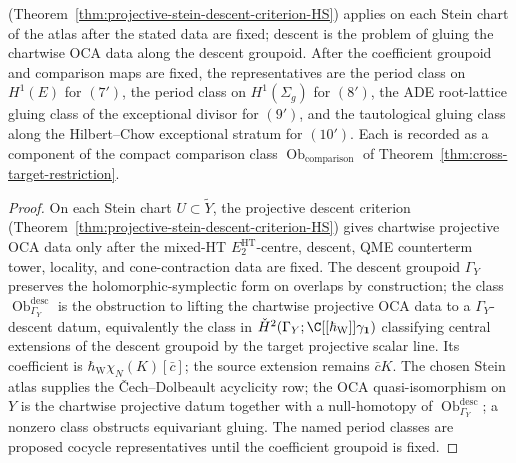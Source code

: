 \begin{cor}
(Theorem~\ref{thm:projective-stein-descent-criterion-HS})
applies on each Stein chart of the atlas after the stated data are
        fixed; descent is the problem of gluing the chartwise OCA data along the
        descent groupoid.  After the coefficient groupoid and comparison
  maps are fixed, the representatives are the period class on \(H^1(E)\) for
  \((7')\), the period class on \(H^1(\Sigma_g)\) for \((8')\), the ADE
  root-lattice gluing class of the exceptional divisor for \((9')\),
  and the tautological gluing class along the Hilbert--Chow exceptional
  stratum for \((10')\).  Each is recorded as a component of the compact comparison class
\(\operatorname{Ob}_{\mathrm{comparison}}\) of
Theorem~\ref{thm:cross-target-restriction}.
\end{cor}

\begin{proof}
On each Stein chart \(U\subset\widetilde Y\), the projective descent
criterion
(Theorem~\ref{thm:projective-stein-descent-criterion-HS}) gives
chartwise projective OCA data only after the mixed-HT
\(E_2^{\mathrm{HT}}\)-centre, descent, QME counterterm tower, locality,
and cone-contraction data are fixed.  The descent
groupoid \(\Gamma_Y\) preserves the holomorphic-symplectic form on
overlaps by construction; the class
\(\operatorname{Ob}^{\mathrm{desc}}_{\Gamma_Y}\) is the obstruction
to lifting the chartwise projective OCA data to a
\(\Gamma_Y\)-descent datum, equivalently the class in
\(\check H^2(\Gamma_Y;
\C[[\hbar_{\mathrm W}]]\gamma_{\mathbf1})\)
classifying central extensions of the descent groupoid by the target
projective scalar line.  Its coefficient is
\(\hbar_{\mathrm W}\chi_N(K)[\bar c]\); the source extension remains
\(\bar cK\).  The chosen Stein atlas supplies the
\v{C}ech--Dolbeault acyclicity row; the OCA quasi-isomorphism on \(Y\)
is the chartwise projective datum together with a null-homotopy of
\(\operatorname{Ob}^{\mathrm{desc}}_{\Gamma_Y}\); a nonzero class
obstructs equivariant gluing.  The named period classes are proposed
cocycle representatives until the coefficient groupoid is fixed.
\end{proof}

